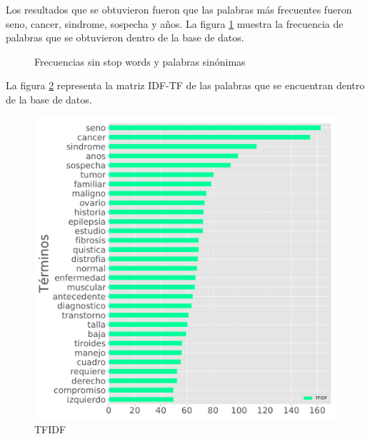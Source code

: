 Los resultados que se obtuvieron fueron que las palabras más frecuentes fueron seno, cancer, sindrome, sospecha y años. La figura \ref{fig:sin} muestra la frecuencia de palabras que se obtuvieron dentro de la base de datos.

\begin{figure}[H]
	\centering
	\caption{Frecuencias sin stop words y palabras sinónimas} \label{fig:sin}
\end{figure} 

La figura \ref{fig:IDFTF} representa la matriz IDF-TF de las palabras que se encuentran dentro de la base de datos.  

\begin{figure}[] 
	\centering
	\includegraphics[width=1\textwidth]{Kap4/TFIDF1}
	\caption{TFIDF} 
	\label{fig:IDFTF}
\end{figure}


